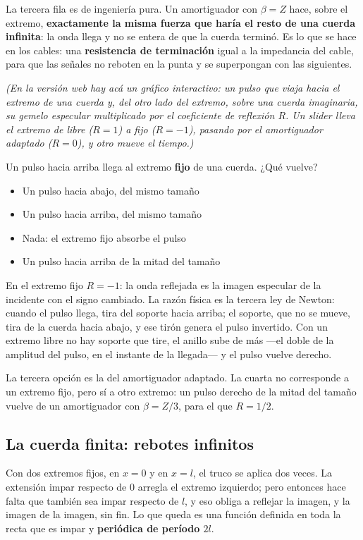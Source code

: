 \documentclass[
  spanish,
  a4paper,
]{scrbook}
\providecommand{\tightlist}{%
  \setlength{\itemsep}{0pt}\setlength{\parskip}{0pt}}
\theoremstyle{definition}
\theoremstyle{plain}
\theoremstyle{definition}
\theoremstyle{plain}
\theoremstyle{definition}
\theoremstyle{remark}
\begin{document}
La tercera fila es de ingeniería pura. Un amortiguador con \(\beta = Z\)
hace, sobre el extremo, \textbf{exactamente la misma fuerza que haría el
resto de una cuerda infinita}: la onda llega y no se entera de que la
cuerda terminó. Es lo que se hace en los cables: una \textbf{resistencia
de terminación} igual a la impedancia del cable, para que las señales no
reboten en la punta y se superpongan con las siguientes.

\emph{(En la versión web hay acá un gráfico interactivo: un pulso que
viaja hacia el extremo de una cuerda y, del otro lado del extremo, sobre
una cuerda imaginaria, su gemelo especular multiplicado por el
coeficiente de reflexión \(R\). Un slider lleva el extremo de libre
(\(R=1\)) a fijo (\(R=-1\)), pasando por el amortiguador adaptado
(\(R=0\)), y otro mueve el tiempo.)}

Un pulso hacia arriba llega al extremo \textbf{fijo} de una cuerda. ¿Qué
vuelve?

\begin{itemize}
\tightlist
\item
  {Un pulso hacia abajo, del mismo tamaño}
\item
  {Un pulso hacia arriba, del mismo tamaño}
\item
  {Nada: el extremo fijo absorbe el pulso}
\item
  {Un pulso hacia arriba de la mitad del tamaño}
\end{itemize}

En el extremo fijo \(R = -1\): la onda reflejada es la imagen especular
de la incidente con el signo cambiado. La razón física es la tercera ley
de Newton: cuando el pulso llega, tira del soporte hacia arriba; el
soporte, que no se mueve, tira de la cuerda hacia abajo, y ese tirón
genera el pulso invertido. Con un extremo libre no hay soporte que tire,
el anillo sube de más ---el doble de la amplitud del pulso, en el
instante de la llegada--- y el pulso vuelve derecho.

La tercera opción es la del amortiguador adaptado. La cuarta no
corresponde a un extremo fijo, pero sí a otro extremo: un pulso derecho
de la mitad del tamaño vuelve de un amortiguador con \(\beta = Z/3\),
para el que \(R = 1/2\).

\subsection{La cuerda finita: rebotes infinitos}\label{sec-hip-finita}

Con dos extremos fijos, en \(x=0\) y en \(x=l\), el truco se aplica dos
veces. La extensión impar respecto de \(0\) arregla el extremo
izquierdo; pero entonces hace falta que también sea impar respecto de
\(l\), y eso obliga a reflejar la imagen, y la imagen de la imagen, sin
fin. Lo que queda es una función definida en toda la recta que es impar
y \textbf{periódica de período \(2l\)}.
\end{document}
